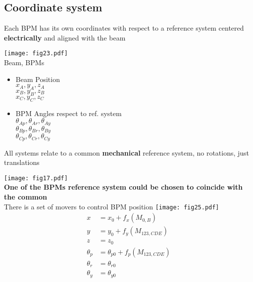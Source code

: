 \subsection{Coordinate system}\par
Each BPM has its own coordinates with respect to a reference system centered \textbf{electrically} and aligned with the beam\par
\vspace*{0.5cm}
\begin{minipage}{7cm}
  \texttt{[image: fig23.pdf]}\\
  {\color{red}Beam}, {\color{forestgreen} BPMs}\\
\end{minipage}
\begin{minipage}{7cm}
\begin{itemize}
 \item Beam Position
 \\$x_A,y_A,z_A$\\$x_B,y_B,z_B$\\$x_C,y_C,z_C$
 \item BPM Angles respect to ref. system\\
 $\theta_{Ap},\theta_{Ar},\theta_{Ay}$\\
 $\theta_{Bp},\theta_{Br},\theta_{By}$\\
 $\theta_{Cp},\theta_{Cr},\theta_{Cy}$
\end{itemize}
\end{minipage}\par
All systems relate to a common \textbf{mechanical} reference system, no rotations, just translations\par
\centering
\texttt{[image: fig17.pdf]}\\
\textbf{One of the BPMs reference system could be chosen to coincide with the common}\\
There is a set of movers to control BPM position\vspace{-0.5cm}
\centering
\texttt{[image: fig25.pdf]} 
\begin{align*}
 x &= x_0+f_x(M_{0,B})\\
 y &= y_0+f_y(M_{123,CDE})\\
 z &= z_0\\
 \theta_p &= \theta_{p0}+f_p(M_{123,CDE})\\
 \theta_r &= \theta_{r0}\\
 \theta_y &= \theta_{y0}
\end{align*}\par
